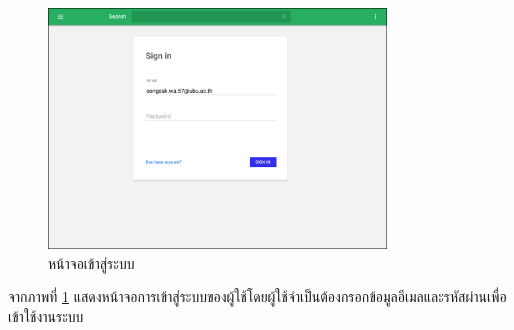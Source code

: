 \begin{enumerate}
\begin{itemize}
\begin{itemize}
\begin{figure}[H]
					\includegraphics[width=0.8\textwidth]{Figures/3/UIWeb/Login}
					\caption{หน้าจอเข้าสู่ระบบ}
					\label{Fig:Login}
				\end{figure}
				จากภาพที่ \ref{Fig:Login} แสดงหน้าจอการเข้าสู่ระบบของผู้ใช้โดยผู้ใช้จำเป็นต้องกรอกข้อมูลอีเมลและรหัสผ่านเพื่อเข้าใช้งานระบบ
			\end{itemize}
		\end{itemize}
	\end{enumerate}
\newpage

